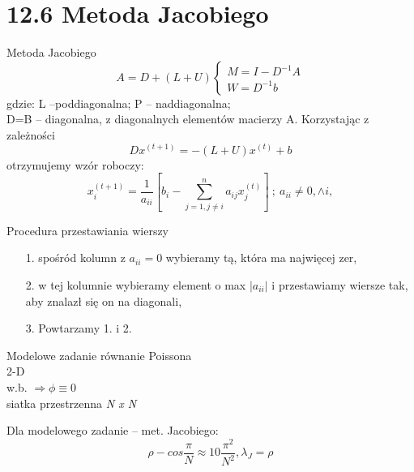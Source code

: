 \section{12.6 Metoda Jacobiego}

\begin{frame}{Metoda Jacobiego}
  $$
  A=D+(L+U)
  \begin{cases}
  M=I-D^{-1}A\\
  W=D^{-1}b
  \end{cases}
  $$
  gdzie: L --poddiagonalna; P -- naddiagonalna;\\
  D=B -- diagonalna, z diagonalnych elementów macierzy A. Korzystając z zależności
  $$\boxed{Dx^{(t+1)}= -(L+U)x^{(t)}+b}$$
  otrzymujemy wzór roboczy:
  $$x_i^{(t+1)}=\frac{1}{a_{ii}}[b_i-\sum_{j=1,j\neq i}^{n} a_{ij}x_j^{(t)}]\  ;\  a_{ii} \neq 0,\wedge i,$$
\end{frame}

\begin{frame}
  \begin{block}{Procedura przestawiania wierszy}
    \begin{itemize}
      \item[1.] spośród kolumn z $a_{ii} = 0$ wybieramy tą, która ma najwięcej zer,
      \item[2.] w tej kolumnie wybieramy element o max $|a_{ii}|$ i przestawiamy wiersze tak, aby znalazł się on na diagonali,
      \item[3.] Powtarzamy 1. i 2.
    \end{itemize}
  \end{block}
\end{frame}

\begin{frame}{}
  \begin{block}{Modelowe zadanie}
    równanie Poissona
    \\2-D
    \\w.b. $\Rightarrow\phi\equiv 0$
    \\siatka przestrzenna \emph{N x N}
  \end{block}

  \begin{block}{Dla modelowego zadanie -- met. Jacobiego:}
    $$\rho - cos\frac{\pi}{N}\approx 1 0 \frac{\pi^2}{N^2}, \lambda _J = \rho$$
  \end{block}
\end{frame}

